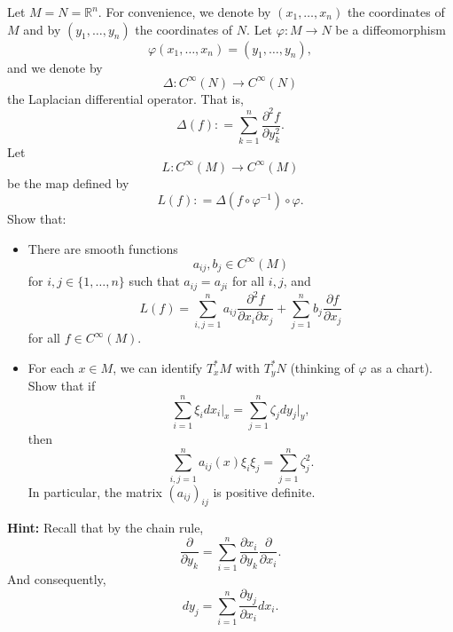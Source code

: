 \documentclass{ximera}
\begin{document}
\begin{exercise}
    Let $M = N = \mathbb{R}^n$. For convenience, we denote by $(x_1, \ldots , x_n)$ the coordinates of $M$ and by $(y_1, \ldots, y_n)$ the coordinates of $N$. Let   $\varphi : M \to N $  be a diffeomorphism 
    \[ \varphi(x_1, \ldots , x_n) = (y_1, \ldots , y_n), \] 
    and we denote by   
    \[   \Delta : C^{\infty}(N) \to C^{\infty } (N)     \]
    the Laplacian differential operator. That is, 
    \[        \Delta (f) : = \sum_{k = 1} ^{n} \frac{\partial ^2 f }{\partial y_k ^2} .                    \]
    Let 
    \[     L : C^{\infty} (M) \to C^{\infty } (M)           \]
    be the map defined by 
    \[    L (f) : =  \Delta ( f \circ \varphi ^{-1} ) \circ \varphi .        \]
    Show that: 
    \begin{itemize}
        \item There are smooth functions 
        \[ a_{ij }, b_j \in C^{\infty} (M) \] 
        for $i , j \in  \{ 1 , \ldots , n \}$ such that $a_{ij} = a_{ji}$ for all $i,j$, and 
    \[      L (f) = \sum_{i,j = 1 }^n a_{ij}  \frac{\partial ^2 f}{\partial x _i \partial x _j }  + \sum _{j = 1 } ^n    b_j \frac{\partial f }{\partial x _j}      \]
    for all $f \in C^{\infty} (M)$. 
    \item For each $x \in M$, we can identify $T^{\ast}_xM$ with $T^{\ast}_{y} N $ (thinking of $\varphi$ as a chart). Show that if 
    \[        \sum _{ i = 1 } ^n \xi _i d x _i \vert _x = \sum _{ j =1} ^n \zeta _j d y_j \vert _y   ,      \]
    then 
    \[      \sum _{i, j = 1 } ^n a_{ij}(x) \xi _i \xi _j = \sum _{j = 1 }^n  \zeta _j  ^2 .         \]
    In particular, the matrix $(a_{ij})_{ij}$ is positive definite. 
    \end{itemize}


    \textbf{Hint: }Recall that by the chain rule,  
    \[     \frac{\partial}{\partial y _k } = \sum _{i = 1 }^ n \frac{\partial x _i }{ \partial y _k } \frac{\partial }{\partial x_i} .           \]
    And consequently, 
    \[     d y_j = \sum_{i = 1 } ^n \frac{\partial y_ j}{\partial x _i} d x_i  .                            \]
        
\end{exercise}
\end{document}
